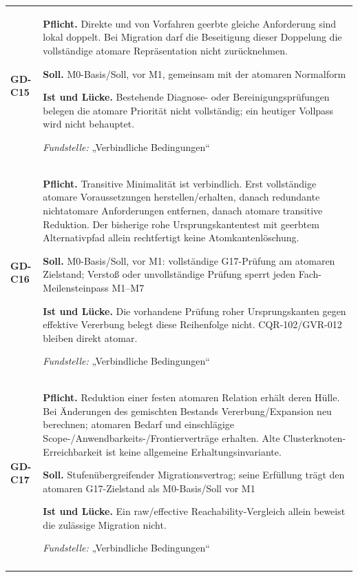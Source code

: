 \begin{longtable}{@{}P{20mm}P{128mm}@{}}
\label{rule:GD-C15}\textbf{GD-C15} &
\textbf{Pflicht.} Direkte und von Vorfahren geerbte gleiche Anforderung sind lokal doppelt. Bei Migration darf die Beseitigung dieser Doppelung die vollständige atomare Repräsentation nicht zurücknehmen.\par\smallskip
\textbf{Soll.} M0-Basis/Soll, vor M1, gemeinsam mit der atomaren Normalform\par\smallskip
\textbf{Ist und Lücke.} Bestehende Diagnose- oder Bereinigungsprüfungen belegen die atomare Priorität nicht vollständig; ein heutiger Vollpass wird nicht behauptet.\par\smallskip
\emph{Fundstelle:} „Verbindliche Bedingungen“\\\addlinespace[5pt]
\label{rule:GD-C16}\textbf{GD-C16} &
\textbf{Pflicht.} Transitive Minimalität ist verbindlich. Erst vollständige atomare Voraussetzungen herstellen/erhalten, danach redundante nichtatomare Anforderungen entfernen, danach atomare transitive Reduktion. Der bisherige rohe Ursprungskantentest mit geerbtem Alternativpfad allein rechtfertigt keine Atomkantenlöschung.\par\smallskip
\textbf{Soll.} M0-Basis/Soll, vor M1: vollständige G17-Prüfung am atomaren Zielstand; Verstoß oder unvollständige Prüfung sperrt jeden Fach-Meilensteinpass M1–M7\par\smallskip
\textbf{Ist und Lücke.} Die vorhandene Prüfung roher Ursprungskanten gegen effektive Vererbung belegt diese Reihenfolge nicht. CQR-102/GVR-012 bleiben direkt atomar.\par\smallskip
\emph{Fundstelle:} „Verbindliche Bedingungen“\\\addlinespace[5pt]
\label{rule:GD-C17}\textbf{GD-C17} &
\textbf{Pflicht.} Reduktion einer festen atomaren Relation erhält deren Hülle. Bei Änderungen des gemischten Bestands Vererbung/Expansion neu berechnen; atomaren Bedarf und einschlägige Scope-/Anwendbarkeits-/Frontierverträge erhalten. Alte Clusterknoten-Erreichbarkeit ist keine allgemeine Erhaltungsinvariante.\par\smallskip
\textbf{Soll.} Stufenübergreifender Migrationsvertrag; seine Erfüllung trägt den atomaren G17-Zielstand als M0-Basis/Soll vor M1\par\smallskip
\textbf{Ist und Lücke.} Ein raw/effective Reachability-Vergleich allein beweist die zulässige Migration nicht.\par\smallskip
\emph{Fundstelle:} „Verbindliche Bedingungen“\\\addlinespace[5pt]

\end{longtable}
